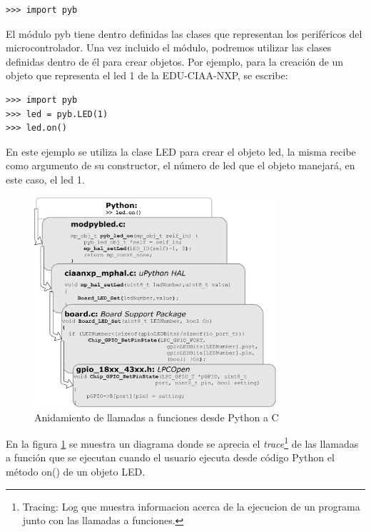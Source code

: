 \begin{verbatim}
>>> import pyb
\end{verbatim}

El módulo pyb tiene dentro definidas las clases que representan los periféricos del microcontrolador. Una vez incluido el módulo, podremos utilizar las clases definidas dentro de él para crear objetos.
Por ejemplo, para la creación de un objeto que representa el led 1 de la EDU-CIAA-NXP, se escribe:

\begin{verbatim}
>>> import pyb
>>> led = pyb.LED(1)
>>> led.on()
\end{verbatim}

En este ejemplo se utiliza la clase LED para crear el objeto led, la misma recibe como argumento de su constructor, el número de led que el objeto manejará, en este caso, el led 1.

\begin{figure}[ht]
  \centering
    \includegraphics[width=0.8\textwidth]{Figures/fig_calls}
  \caption{Anidamiento de llamadas a funciones desde Python a C}
  \label{fig:calls}
\end{figure}

En la figura \ref{fig:calls} se muestra un diagrama donde se aprecia el \textit{trace}\footnote{Tracing: Log que muestra informacion acerca de la ejecucion de un programa junto con las llamadas a funciones.} de las llamadas a función que se ejecutan cuando el usuario ejecuta desde código Python el método on() de un objeto LED.

